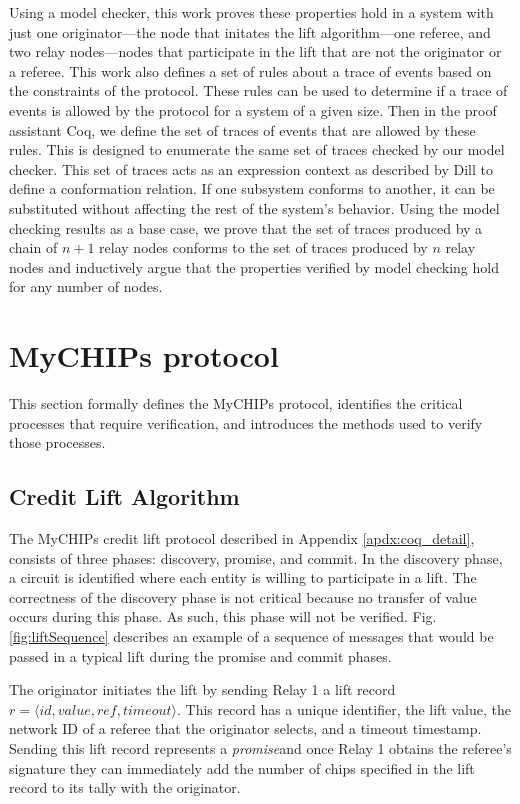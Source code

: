 \documentclass[runningheads]{llncs}
\newcommand{\promise}{\emph{promise}}
\begin{document}
Using a model checker, this work proves these properties hold in a system with just one originator---the node that initates the lift algorithm---one referee, and two relay nodes---nodes that participate in the lift that are not the originator or a referee. This work also defines a set of rules about a trace of events based on the constraints of the protocol. These rules can be used to determine if a trace of events is allowed by the protocol for a system of a given size. 
Then in the proof assistant Coq, we define the set of traces of events that are allowed by these rules. This is designed to enumerate the same set of traces checked by our model checker. This set of traces acts as an expression context as described by Dill \cite{dill_trace_theory} to define a conformation relation. If one subsystem conforms to another, it can be substituted without affecting the rest of the system's behavior. 
Using the model checking results as a base case, we prove that the set of traces produced by a chain of $n+1$ relay nodes conforms to the set of traces produced by $n$ relay nodes and inductively argue that the properties verified by model checking hold for any number of nodes.

\section{MyCHIPs protocol}
\label{sec:protocol_def}
This section formally defines the MyCHIPs protocol, identifies the critical processes that require verification, and introduces the methods used to verify those processes.

\subsection{Credit Lift Algorithm}\label{sec:liftAlgorithm}
The MyCHIPs credit lift protocol described in Appendix \ref{apdx:coq_detail}, consists of three phases: discovery, promise, and commit. In the discovery phase, a circuit is identified where each entity is willing to participate in a lift. The correctness of the discovery phase is not critical because no transfer of value occurs during this phase. As such, this phase will not be verified.
Fig. \ref{fig:liftSequence} describes an example of a sequence of messages that would be passed in a typical lift during the promise and commit phases.

The originator initiates the lift by sending Relay 1 a lift record
$r = \langle id, value, ref, timeout\rangle.$ This record has a unique identifier, the lift value, the network ID of a referee that the originator selects, and a timeout timestamp. Sending this lift record represents a \promise and once Relay 1 obtains the referee's signature they can immediately add the number of chips specified in the lift record to its tally with the originator.
\end{document}
